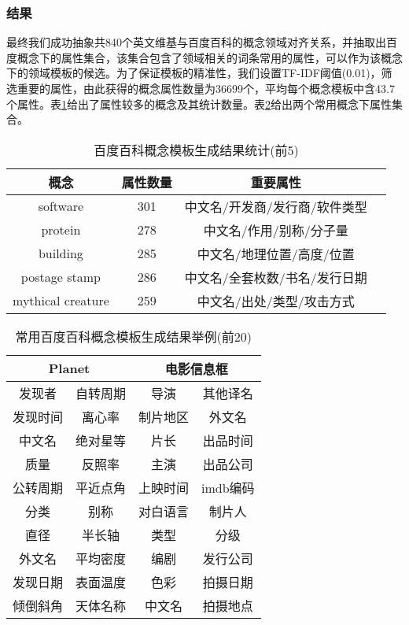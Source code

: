 \subsubsection{结果}
最终我们成功抽象共840个英文维基与百度百科的概念领域对齐关系，并抽取出百度概念下的属性集合，该集合包含了领域相关的词条常用的属性，可以作为该概念下的领域模板的候选。为了保证模板的精准性，我们设置TF-IDF阈值(0.01)，筛选重要的属性，由此获得的概念属性数量为36699个，平均每个概念模板中含43.7个属性。表\ref{tab:baidu-template-stat}给出了属性较多的概念及其统计数量。表\ref{tab:baidu-template-examples}给出两个常用概念下属性集合。

\begin{table}[htb]
  \centering
  \caption{百度百科概念模板生成结果统计(前5)}
  \label{tab:baidu-template-stat}
    \begin{tabular}{cccc}
      \toprule[1.5pt]
         概念 & 属性数量 & 重要属性\\ \midrule[1pt]
         software      & 301  &  中文名/开发商/发行商/软件类型\\
         protein       & 278  & 中文名/作用/别称/分子量       \\
         building      & 285  & 中文名/地理位置/高度/位置     \\
         postage stamp & 286  & 中文名/全套枚数/书名/发行日期 \\
         mythical creature  & 259 & 中文名/出处/类型/攻击方式 \\
      \bottomrule[1.5pt]
    \end{tabular}
\end{table}

\begin{table}[htb]
  \centering
  \caption{常用百度百科概念模板生成结果举例(前20)}
  \label{tab:baidu-template-examples}
    \begin{tabular}{cccc}
      \toprule[1.5pt]
         \multicolumn{2}{c}{Planet} & \multicolumn{2}{c}{电影信息框}\\ \midrule[1pt]
         发现者   &  自转周期  & 导演     & 其他译名 \\
         发现时间 &  离心率    & 制片地区 & 外文名   \\
         中文名   &  绝对星等  & 片长     & 出品时间 \\
         质量     &  反照率    & 主演     & 出品公司 \\
         公转周期 &  平近点角  & 上映时间 & imdb编码 \\
         分类     &  别称      & 对白语言 & 制片人   \\
         直径     &  半长轴    & 类型     & 分级     \\
         外文名   &  平均密度  & 编剧     & 发行公司 \\
         发现日期 &  表面温度  & 色彩     & 拍摄日期 \\
         倾倒斜角 &  天体名称  & 中文名   & 拍摄地点 \\
      \bottomrule[1.5pt]
    \end{tabular}
\end{table}

